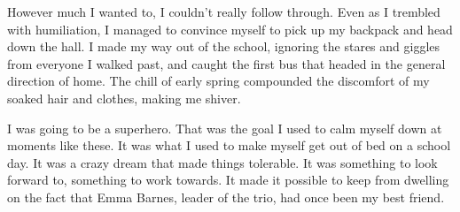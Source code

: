 However much I wanted to, I couldn't really follow through. Even as I trembled with humiliation, I managed to convince myself to pick up my backpack and head down the hall. I made my way out of the school, ignoring the stares and giggles from everyone I walked past, and caught the first bus that headed in the general direction of home. The chill of early spring compounded the discomfort of my soaked hair and clothes, making me shiver.

I was going to be a superhero. That was the goal I used to calm myself down at moments like these. It was what I used to make myself get out of bed on a school day. It was a crazy dream that made things tolerable. It was something to look forward to, something to work towards. It made it possible to keep from dwelling on the fact that Emma Barnes, leader of the trio, had once been my best friend.



\bye
